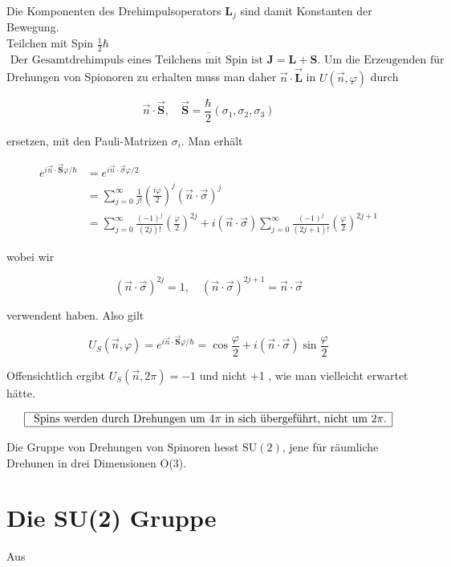 \documentclass[10pt, letterpaper]{article}
\begin{document}
Die Komponenten des Drehimpulsoperators $\mathbf{L}_{j}$ sind damit Konstanten der Bewegung.\\
Teilchen mit Spin $\frac{1}{2} \hbar$\\
$\overline{\text { Der Gesamtdrehimpuls eines Teilchens mit Spin ist } \mathbf{J}=\mathbf{L}+\mathbf{S} \text {. Um die Erzeugenden für }}$ Drehungen von Spionoren zu erhalten muss man daher $\vec{n} \cdot \overrightarrow{\mathbf{L}}$ in $U(\vec{n}, \varphi)$ durch

$$
\vec{n} \cdot \overrightarrow{\mathbf{S}}, \quad \overrightarrow{\mathbf{S}}=\frac{\hbar}{2}\left(\sigma_{1}, \sigma_{2}, \sigma_{3}\right)
$$

ersetzen, mit den Pauli-Matrizen $\sigma_{i}$. Man erhält

$$
\begin{aligned}
e^{i \vec{n} \cdot \overrightarrow{\mathbf{S}} \varphi / \hbar} & =e^{i \vec{n} \cdot \vec{\sigma} \varphi / 2} \\
& =\sum_{j=0}^{\infty} \frac{1}{j!}\left(\frac{i \varphi}{2}\right)^{j}(\vec{n} \cdot \vec{\sigma})^{j} \\
& =\sum_{j=0}^{\infty} \frac{(-1)^{j}}{(2 j)!}\left(\frac{\varphi}{2}\right)^{2 j}+i(\vec{n} \cdot \vec{\sigma}) \sum_{j=0}^{\infty} \frac{(-1)^{j}}{(2 j+1)!}\left(\frac{\varphi}{2}\right)^{2 j+1}
\end{aligned}
$$

wobei wir

$$
(\vec{n} \cdot \vec{\sigma})^{2 j}=1, \quad(\vec{n} \cdot \vec{\sigma})^{2 j+1}=\vec{n} \cdot \vec{\sigma}
$$

verwendent haben. Also gilt

$$
U_{S}(\vec{n}, \varphi)=e^{i \vec{n} \cdot \overrightarrow{\mathbf{S}} \varphi / \hbar}=\cos \frac{\varphi}{2}+i(\vec{n} \cdot \vec{\sigma}) \sin \frac{\varphi}{2}
$$

Offensichtlich ergibt $U_{S}(\vec{n}, 2 \pi)=-1$ und nicht +1 , wie man vielleicht erwartet hätte.

$$
\begin{array}{|l|}
\hline \text { Spins werden durch Drehungen um } 4 \pi \text { in sich übergeführt, nicht um } 2 \pi . \\
\hline
\end{array}
$$

Die Gruppe von Drehungen von Spinoren hesst $\mathrm{SU}(2)$, jene für räumliche Drehunen in drei Dimensionen O(3).

\section*{Die SU(2) Gruppe}
Aus
\end{document}
